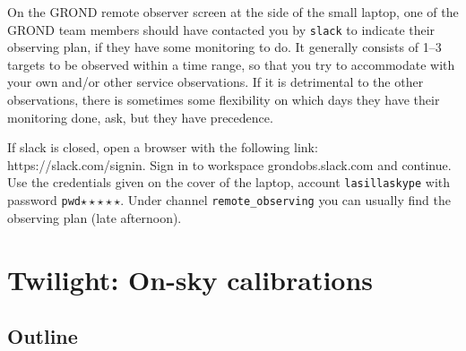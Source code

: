 \documentclass[11pt,fleqn]{book}
\begin{document}
On the GROND remote observer screen at the side of the small laptop, one of the GROND team members should have contacted you by \texttt{slack} to indicate their observing plan, if they have some monitoring to do.  It generally consists of 1--3 targets to be observed within a time range, so that you try to accommodate with your own and/or other service observations.  If it is detrimental to the other observations, there is sometimes some flexibility on which days they have their monitoring done, ask, but they have precedence.

If slack is closed, open a browser with the following link: https://slack.com/signin. Sign in to workspace grondobs.slack.com and continue. Use the credentials given on the cover of the laptop, account \texttt{lasillaskype} with password \texttt{pwd}$\star\star\star\star\star$. Under channel \texttt{remote\_observing} you can usually find the observing plan (late afternoon). 



\chapter{Twilight: On-sky calibrations}
\label{chap:nightcal}


\section{Outline}
\end{document}
